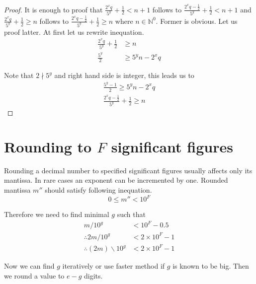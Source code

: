 \documentclass[english]{article}
\newcommand{\idiv}{\backslash}
\renewcommand{\leq}{\leqslant}
\renewcommand{\geq}{\geqslant}
\begin{document}
\begin{proof}
    It is enough to proof that $\frac{2^x q}{5^y} + \frac{1}{2} < n+1$
    follows to $\frac{2^x q - \frac{1}{2}}{5^y} + \frac{1}{2} < n+1$
    and $\frac{2^x q}{5^y} + \frac{1}{2} \geq n$
    follows to $\frac{2^x q - \frac{1}{2}}{5^y} + \frac{1}{2} \geq n$
    where $n \in \mathbb{N}^0$.
    Former is obvious. Let us proof latter. At first let us rewrite inequation.
    \begin{align*}
        \frac{2^x q}{5^y} + \frac{1}{2} & \geq n \\
        \frac{5^y}{2} & \geq 5^y n - 2^x q
    \end{align*}

    Note that $2 \nmid 5^{y}$ and right hand side is integer, this leads us to
    \begin{align*}
        \frac{5^y - 1}{2} \geq 5^y n - 2^x q \\
        \frac{2^x q - \frac{1}{2}}{5^y} + \frac{1}{2} \geq n
    \end{align*}
\end{proof}

\section{Rounding to $F$ significant figures}

Rounding a decimal number to specified significant figures usually affects only its mantissa.
In rare cases an exponent can be incremented by one.
Rounded mantissa $m''$ should satisfy following inequation.
\[
    0 \leq m'' < 10^F
\]

Therefore we need to find minimal $g$ such that
\begin{align*}
    m / 10^g & < 10^F - 0.5 \\
    \therefore 2m / 10^g & < 2 \times 10^F - 1 \\
    \therefore (2m) \idiv 10^g & < 2 \times 10^F - 1
\end{align*}

Now we can find $g$ iteratively or use faster method if $g$ is known to be big.
Then we round a value to $e-g$ digits.
\end{document}
